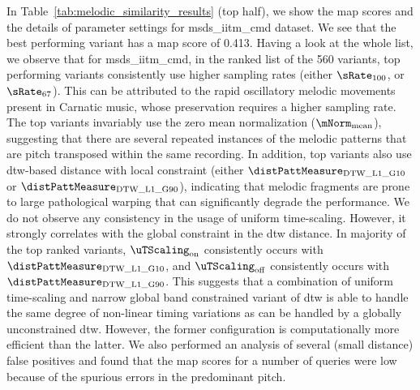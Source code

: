 In Table~\ref{tab:melodic_similarity_results} (top half), we show the \gls{map} scores and the details of parameter settings for \acrshort{msds_iitm_cmd} dataset. We see that the best performing variant has a \gls{map} score of 0.413. Having a look at the whole list, we observe that for \acrshort{msds_iitm_cmd}, in the ranked list of the 560 variants, top performing variants consistently use higher sampling rates (either $\sRate_{100}$, or $\sRate_{67}$). This can be attributed to the rapid oscillatory melodic movements present in Carnatic music, whose preservation requires a higher sampling rate. The top variants invariably use the zero mean normalization ($\mNorm_{\mathrm{mean}}$), suggesting that there are several repeated instances of the melodic patterns that are pitch transposed within the same recording. In addition, top variants also use \gls{dtw}-based distance with local constraint (either $\distPattMeasure_{\mathrm{DTW\_L1\_G10}}$ or $\distPattMeasure_{\mathrm{DTW\_L1\_G90}}$), indicating that melodic fragments are prone to large pathological warping that can significantly degrade the performance. We do not observe any consistency in the usage of uniform time-scaling. However, it strongly correlates with the global constraint in the \gls{dtw} distance. In majority of the top ranked variants, $\uTScaling_{\mathrm{on}}$ consistently occurs with $\distPattMeasure_{\mathrm{DTW\_L1\_G10}}$, and $\uTScaling_{\mathrm{off}}$ consistently occurs with $\distPattMeasure_{\mathrm{DTW\_L1\_G90}}$. This suggests that a combination of uniform time-scaling and narrow global band constrained variant of \gls{dtw} is able to handle the same degree of non-linear timing variations as can be handled by a globally unconstrained \gls{dtw}. However, the former configuration is computationally more efficient than the latter. We also performed an analysis of several (small distance) false positives and found that the \gls{map} scores for a number of queries were low because of the spurious errors in the predominant pitch.


